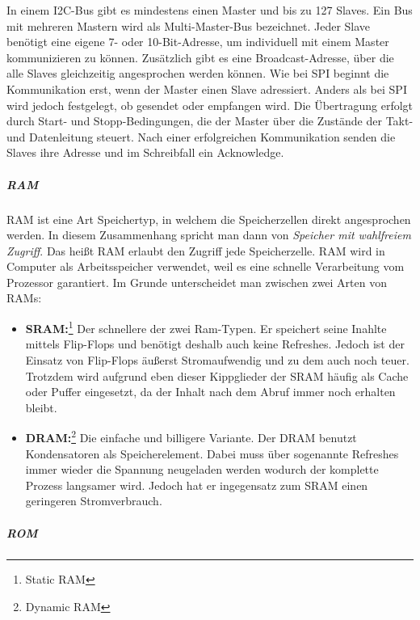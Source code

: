 \documentclass[
    headings=optiontotocandhead,%
    twoside,
    numbers=noenddot,%
    12pt, %
    titlepage, %
    parskip=full, %
    listof=leveldown, 
    numbers=noenddot, %
    a4paper,DIV=14,
    BCOR=15mm,
]{scrbook}
\providecommand{\tightlist}{%
  \setlength{\itemsep}{0pt}\setlength{\parskip}{0pt}}
\begin{document}
\begin{itemize}
  In einem I2C-Bus gibt es mindestens einen Master und bis zu 127
  Slaves. Ein Bus mit mehreren Mastern wird als Multi-Master-Bus
  bezeichnet. Jeder Slave benötigt eine eigene 7- oder 10-Bit-Adresse,
  um individuell mit einem Master kommunizieren zu können. Zusätzlich
  gibt es eine Broadcast-Adresse, über die alle Slaves gleichzeitig
  angesprochen werden können. Wie bei SPI beginnt die Kommunikation
  erst, wenn der Master einen Slave adressiert. Anders als bei SPI wird
  jedoch festgelegt, ob gesendet oder empfangen wird. Die Übertragung
  erfolgt durch Start- und Stopp-Bedingungen, die der Master über die
  Zustände der Takt- und Datenleitung steuert. Nach einer erfolgreichen
  Kommunikation senden die Slaves ihre Adresse und im Schreibfall ein
  Acknowledge.
\end{itemize}

\hypertarget{ram}{%
\subparagraph{RAM}\label{ram}}

RAM ist eine Art Speichertyp, in welchem die Speicherzellen direkt
angesprochen werden. In diesem Zusammenhang spricht man dann von
\emph{Speicher mit wahlfreiem Zugriff}. Das heißt RAM erlaubt den
Zugriff jede Speicherzelle. RAM wird in Computer als Arbeitsspeicher
verwendet, weil es eine schnelle Verarbeitung vom Prozessor garantiert.
Im Grunde unterscheidet man zwischen zwei Arten von RAMs:

\begin{itemize}
\tightlist
\item
  \textbf{SRAM:}\footnote{Static RAM} Der schnellere der zwei Ram-Typen.
  Er speichert seine Inahlte mittels Flip-Flops und benötigt deshalb
  auch keine Refreshes. Jedoch ist der Einsatz von Flip-Flops äußerst
  Stromaufwendig und zu dem auch noch teuer. Trotzdem wird aufgrund eben
  dieser Kippglieder der SRAM häufig als Cache oder Puffer eingesetzt,
  da der Inhalt nach dem Abruf immer noch erhalten bleibt.
\item
  \textbf{DRAM:}\footnote{Dynamic RAM} Die einfache und billigere
  Variante. Der DRAM benutzt Kondensatoren als Speicherelement. Dabei
  muss über sogenannte Refreshes immer wieder die Spannung neugeladen
  werden wodurch der komplette Prozess langsamer wird. Jedoch hat er
  ingegensatz zum SRAM einen geringeren Stromverbrauch.
\end{itemize}

\hypertarget{rom}{%
\subparagraph{ROM}\label{rom}}
\end{document}
